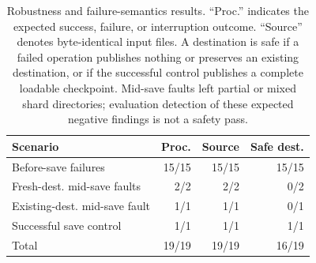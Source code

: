 \begin{table}[t]
  \centering
  \small
  \begin{tabular}{lrrr}
    \toprule
    Scenario & Proc. & Source & Safe dest. \\
    \midrule
    Before-save failures & 15/15 & 15/15 & 15/15 \\
    Fresh-dest. mid-save faults & 2/2 & 2/2 & 0/2 \\
    Existing-dest. mid-save fault & 1/1 & 1/1 & 0/1 \\
    Successful save control & 1/1 & 1/1 & 1/1 \\
    \midrule
    Total & 19/19 & 19/19 & 16/19 \\
    \bottomrule
  \end{tabular}
  \caption{Robustness and failure-semantics results. ``Proc.'' indicates the
  expected success, failure, or interruption outcome. ``Source'' denotes
  byte-identical input files. A destination is safe if a failed operation
  publishes nothing or preserves an existing destination, or if the successful
  control publishes a complete loadable checkpoint. Mid-save faults left
  partial or mixed shard directories; evaluation detection of these expected
  negative findings is not a safety pass.}
  \label{tab:robustness}
\end{table}
